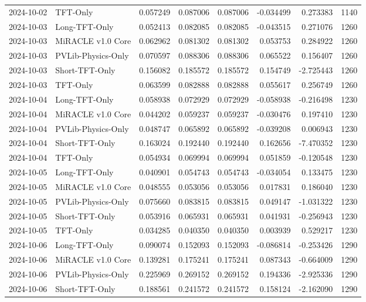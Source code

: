 \begin{tabular}{llrrrrrr}
2024-10-02 & TFT-Only & 0.057249 & 0.087006 & 0.087006 & -0.034499 & 0.273383 & 1140 \\
2024-10-03 & Long-TFT-Only & 0.052413 & 0.082085 & 0.082085 & -0.043515 & 0.271076 & 1260 \\
2024-10-03 & MiRACLE v1.0 Core & 0.062962 & 0.081302 & 0.081302 & 0.053753 & 0.284922 & 1260 \\
2024-10-03 & PVLib-Physics-Only & 0.070597 & 0.088306 & 0.088306 & 0.065522 & 0.156407 & 1260 \\
2024-10-03 & Short-TFT-Only & 0.156082 & 0.185572 & 0.185572 & 0.154749 & -2.725443 & 1260 \\
2024-10-03 & TFT-Only & 0.063599 & 0.082888 & 0.082888 & 0.055617 & 0.256749 & 1260 \\
2024-10-04 & Long-TFT-Only & 0.058938 & 0.072929 & 0.072929 & -0.058938 & -0.216498 & 1230 \\
2024-10-04 & MiRACLE v1.0 Core & 0.044202 & 0.059237 & 0.059237 & -0.030476 & 0.197410 & 1230 \\
2024-10-04 & PVLib-Physics-Only & 0.048747 & 0.065892 & 0.065892 & -0.039208 & 0.006943 & 1230 \\
2024-10-04 & Short-TFT-Only & 0.163024 & 0.192440 & 0.192440 & 0.162656 & -7.470352 & 1230 \\
2024-10-04 & TFT-Only & 0.054934 & 0.069994 & 0.069994 & 0.051859 & -0.120548 & 1230 \\
2024-10-05 & Long-TFT-Only & 0.040901 & 0.054743 & 0.054743 & -0.034054 & 0.133475 & 1230 \\
2024-10-05 & MiRACLE v1.0 Core & 0.048555 & 0.053056 & 0.053056 & 0.017831 & 0.186040 & 1230 \\
2024-10-05 & PVLib-Physics-Only & 0.075660 & 0.083815 & 0.083815 & 0.049147 & -1.031322 & 1230 \\
2024-10-05 & Short-TFT-Only & 0.053916 & 0.065931 & 0.065931 & 0.041931 & -0.256943 & 1230 \\
2024-10-05 & TFT-Only & 0.034285 & 0.040350 & 0.040350 & 0.003939 & 0.529217 & 1230 \\
2024-10-06 & Long-TFT-Only & 0.090074 & 0.152093 & 0.152093 & -0.086814 & -0.253426 & 1290 \\
2024-10-06 & MiRACLE v1.0 Core & 0.139281 & 0.175241 & 0.175241 & 0.087343 & -0.664009 & 1290 \\
2024-10-06 & PVLib-Physics-Only & 0.225969 & 0.269152 & 0.269152 & 0.194336 & -2.925336 & 1290 \\
2024-10-06 & Short-TFT-Only & 0.188561 & 0.241572 & 0.241572 & 0.158124 & -2.162090 & 1290 \\

\end{tabular}
